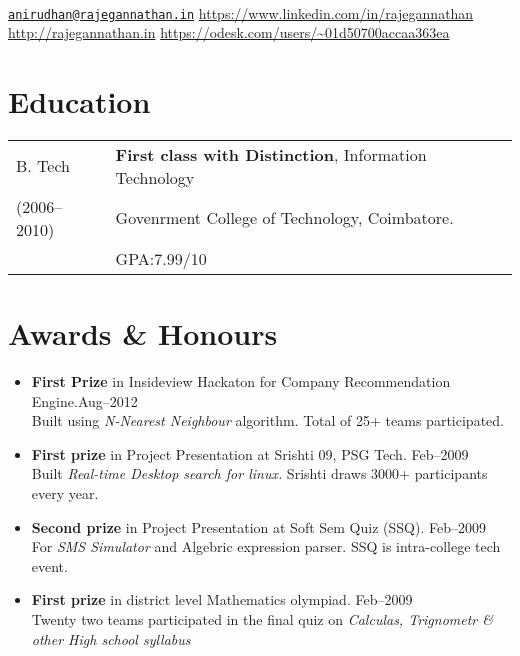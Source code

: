 \documentclass{resume}
\begin{document}
\\
{\href{mailto:anirudhan@rajegannathan.in}{\nolinkurl{anirudhan@rajegannathan.in}} \hfill \url{https://www.linkedin.com/in/rajegannathan}}\\
{\url{http://rajegannathan.in} \hfill \url{https://odesk.com/users/~01d50700accaa363ea}}

\section{Education}
\begin{tabular}{>{\centering\arraybackslash}p{1in}l}
  B. Tech & \textbf{First class with Distinction}, Information Technology\\
  \small{(2006--2010)} & Govenrment College of Technology, Coimbatore.\\
    & GPA:\@ 7.99/10
\end{tabular}

\section{Awards \& Honours}
  \begin{itemize}[label={$\ast$}]
    \item \textbf{First Prize} in Insideview Hackaton for Company Recommendation Engine.\hfill Aug--2012\\
      \small{Built using \textit{N-Nearest Neighbour} algorithm.  Total of 25+ teams participated.}
    \item \textbf{First prize} in Project Presentation at Srishti 09, PSG Tech. \hfill Feb--2009\\
      \small{Built \textit{Real-time Desktop search for linux.} Srishti draws 3000+ participants every year.}
    \item \textbf{Second prize} in Project Presentation at Soft Sem Quiz (SSQ). \hfill Feb--2009\\
      \small{For \textit{SMS Simulator} and Algebric expression parser. SSQ is intra-college tech event.}
    \item \textbf{First prize} in district level Mathematics olympiad. \hfill Feb--2009\\
      \small{Twenty two teams participated in the final quiz on \textit{Calculas, Trignometr \& other High school syllabus}}
  \end{itemize}
\end{document}
